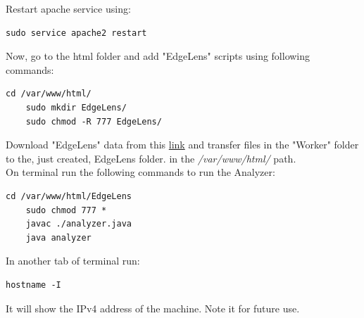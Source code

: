 \documentclass{article}
\begin{document}
Restart apache service using:
\begin{lstlisting}[style=BashInputStyle]
    sudo service apache2 restart
\end{lstlisting}
Now, go to the html folder and add "EdgeLens" scripts using following commands:
\begin{lstlisting}[style=BashInputStyle]
    cd /var/www/html/
    sudo mkdir EdgeLens/
    sudo chmod -R 777 EdgeLens/
\end{lstlisting}
Download "EdgeLens" data from this \href{https://drive.google.com/open?id=1DZWaJHHNMrJFnsCfxoWSIpfDhK7n-qHH}{link} and transfer files in the "Worker" folder to the, just created, EdgeLens folder. in the \textit{/var/www/html/} path.\\
On terminal run the following commands to run the Analyzer:
\begin{lstlisting}[style=BashInputStyle]
    cd /var/www/html/EdgeLens
    sudo chmod 777 *
    javac ./analyzer.java
    java analyzer
\end{lstlisting}
In another tab of terminal run:
\begin{lstlisting}[style=BashInputStyle]
    hostname -I
\end{lstlisting}
It will show the IPv4 address of the machine. Note it for future use.
\end{document}
